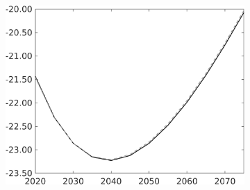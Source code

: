 \begin{figure}[h!!]
\begin{subfigure}{0.75\textwidth}
\begin{minipage}[]{0.32\textwidth}
\end{minipage}
\begin{minipage}[]{0.32\textwidth}
\includegraphics[width=1\textwidth]{../../codding_model/own_basedOnFried/optimalPol_010922_revision/figures/all_13Sept22/PerdifNoTauf_Equlab_regime0_CompTaul_sn_spillover0_nsk0_xgr0_knspil1_sep0_LFlimit0_emsbase0_countec0_GovRev0_etaa0.79_lgd0.png}
\end{minipage}
\end{subfigure}		
\end{figure} 
\clearpage

